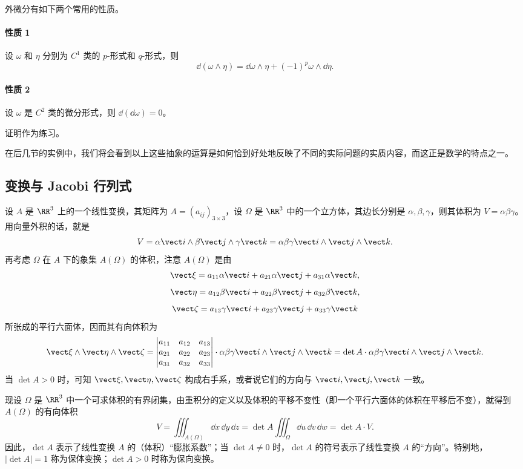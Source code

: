 外微分有如下两个常用的性质。

\paragraph{性质 1}
设 $\omega$ 和 $\eta$ 分别为 $C^1$ 类的 $p$-形式和 $q$-形式，则
\[
  \dd(\omega\wedge\eta)=\dd\omega\wedge\eta+(-1)^p\omega\wedge\dd\eta.
\]

\paragraph{性质 2}
设 $\omega$ 是 $C^2$ 类的微分形式，则 $\dd(\dd\omega)=0$。

证明作为练习。

在后几节的实例中，我们将会看到以上这些抽象的运算是如何恰到好处地反映了不同的实际问题的实质内容，而这正是数学的特点之一。

\subsection{变换与 Jacobi 行列式}

设 $A$ 是 $\RR^3$ 上的一个线性变换，其矩阵为 $A=(a_{ij})_{3\times3}$，设 $\Omega$ 是 $\RR^3$ 中的一个立方体，其边长分别是 $\alpha,\beta,\gamma$，则其体积为 $V=\alpha\beta\gamma$。用向量外积的话，就是
\[
  V=\alpha\vect i\wedge\beta\vect j\wedge\gamma\vect k
  =\alpha\beta\gamma\vect i\wedge\vect j\wedge\vect k.
\]
再考虑 $\Omega$ 在 $A$ 下的象集 $A(\Omega)$ 的体积，注意 $A(\Omega)$ 是由
\[
\vect\xi=a_{11}\alpha\vect i+a_{21}\alpha\vect j+a_{31}\alpha\vect k,
\]
\[
\vect\eta=a_{12}\beta\vect i+a_{22}\beta\vect j+a_{32}\beta\vect k,
\]
\[
\vect\zeta=a_{13}\gamma\vect i+a_{23}\gamma\vect j+a_{33}\gamma\vect k
\]
所张成的平行六面体，因而其有向体积为
\[
  \vect\xi\wedge\vect\eta\wedge\vect\zeta
  =\begin{vmatrix}
  a_{11}&a_{12}&a_{13}\\a_{21}&a_{22}&a_{23}\\a_{31}&a_{32}&a_{33}
  \end{vmatrix}\cdot\alpha\beta\gamma\vect i\wedge\vect j\wedge\vect k
  =\det A\cdot\alpha\beta\gamma\vect i\wedge\vect j\wedge\vect k.
\]
当 $\det A>0$ 时，可知 $\vect\xi,\vect\eta,\vect\zeta$ 构成右手系，或者说它们的方向与 $\vect i,\vect j,\vect k$ 一致。

现设 $\Omega$ 是 $\RR^3$ 中一个可求体积的有界闭集，由重积分的定义以及体积的平移不变性（即一个平行六面体的体积在平移后不变），就得到 $A(\Omega)$ 的有向体积
\[
  V=\iiint_{A(\Omega)}\dd x\,\dd y\,\dd z
  =\det A\iiint_\Omega\dd u\,\dd v\,\dd w
  =\det A\cdot V.
\]
因此，$\det A$ 表示了线性变换 $A$ 的（体积）“膨胀系数”；当 $\det A\ne0$ 时，$\det A$ 的符号表示了线性变换 $A$ 的“方向”。特别地，$|\det A|=1$ 称为保体变换；$\det A>0$ 时称为保向变换。

